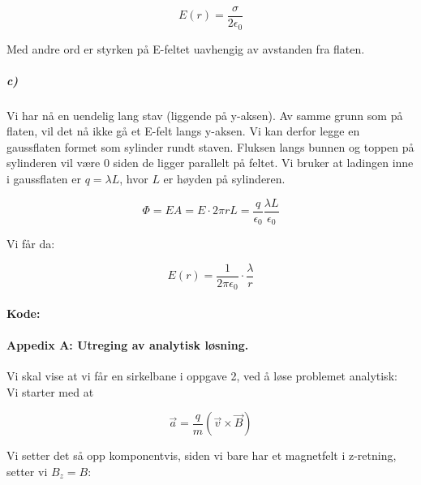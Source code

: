\documentclass[a4paper,norsk, 10pt]{article}
\begin{document}
\begin{equation}
E(r) = \frac{\sigma}{2\epsilon_0}
\end{equation}

Med andre ord er styrken på E-feltet uavhengig av avstanden fra flaten.


\subparagraph*{c)}

Vi har nå en uendelig lang stav (liggende på y-aksen). Av samme grunn som på flaten, vil det nå ikke gå et E-felt langs y-aksen. Vi kan derfor legge en gaussflaten formet som sylinder rundt staven. Fluksen langs bunnen og toppen på sylinderen vil være 0 siden de ligger parallelt på feltet. Vi bruker at ladingen inne i gaussflaten er $q = \lambda L$, hvor $L$ er høyden på sylinderen.



$$ \Phi = EA = E \cdot 2 \pi r L = \frac{q}{\epsilon_0} \dfrac{\lambda L}{\epsilon_0} $$

Vi får da:

\begin{equation}
E(r) = \frac{1}{2\pi \epsilon_0}\cdot \frac{\lambda}{r}
\end{equation}

 


\newpage

\paragraph*{Kode:}
\hspace{5mm}



\newpage


\paragraph*{Appedix A: Utreging av analytisk løsning.}
\hspace{5mm}

Vi skal vise at vi får en sirkelbane i oppgave 2, ved å løse problemet analytisk:\\

Vi starter med at

\begin{equation}
\vec{a} = \frac{q}{m}(\vec{v} \times \vec{B})
\end{equation}

Vi setter det så opp komponentvis, siden vi bare har et magnetfelt i z-retning, setter vi $B_z = B$:
\end{document}
